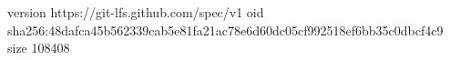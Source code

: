 version https://git-lfs.github.com/spec/v1
oid sha256:48dafca45b562339cab5e81fa21ac78e6d60dc05cf992518ef6bb35c0dbcf4c9
size 108408
